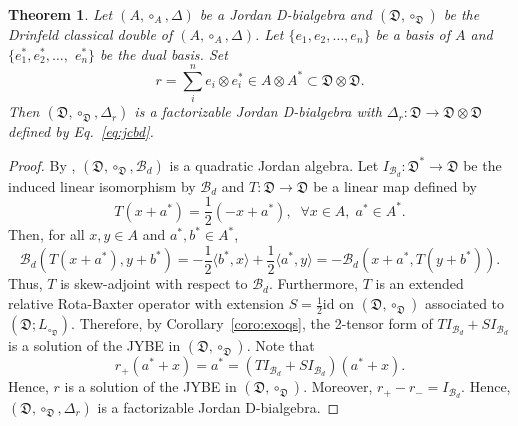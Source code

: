 \documentclass[12pt, reqno, a4paper]{amsart}
\newtheorem{theorem}{Theorem}[section]
\theoremstyle{definition}
\newcommand{\id}{\mathrm{id}}
\begin{document}
\begin{theorem}
	Let $(A, \circ_A, \Delta)$ be a Jordan D-bialgebra and $(\mathfrak{D}, \circ_{\mathfrak{D}})$ be the Drinfeld classical double of $(A, \circ_A, \Delta)$. 
	Let $\{e_{1}, e_{2}, \ldots, e_{n}\}$ be a basis of $A$ and $\{e_{1}^{*}, e_{2}^{*}, \ldots ,$ $e_{n}^{*}\}$ be the dual basis. 
	Set
	\begin{equation*}
		r=\sum_{i}^{n} e_{i} \otimes e_{i}^{*} \in A \otimes A^{*} \subset \mathfrak{D} \otimes \mathfrak{D}.
	\end{equation*}
	Then $\left(\mathfrak{D},\circ_{\mathfrak{D}},\Delta_{r} \right)$ is a factorizable Jordan D-bialgebra with $\Delta_{r}: \mathfrak{D} \to \mathfrak{D} \otimes \mathfrak{D}$ defined by Eq.~\eqref{eq:jcbd}.
\end{theorem}
\begin{proof}
	By \cite{hou2022new}, $\left(\mathfrak{D},\circ_{\mathfrak{D}}, \mathcal{B}_{d} \right)$ is a quadratic Jordan algebra.
	Let $I_{\mathcal{B}_{d}}: \mathfrak{D}^* \to \mathfrak{D}$ be the induced linear isomorphism by $\mathcal{B}_{d}$ and $T: \mathfrak{D} \to \mathfrak{D}$ be a linear map defined by
	\begin{equation*}
		T(x + a^*) = \frac{1}{2}(-x + a^*), \;\; \forall x \in A, \; a^* \in A^*.
	\end{equation*}
	Then, for all $x, y \in A$ and $a^*, b^* \in A^*$,
	\begin{equation*}
		\mathcal{B}_{d}(T(x + a^*), y + b^*) = -\frac{1}{2}\langle b^*, x\rangle + \frac{1}{2}\langle a^*, y\rangle = - \mathcal{B}_{d}(x + a^*, T(y + b^*)).
	\end{equation*}
	Thus, $T$ is skew-adjoint with respect to $\mathcal{B}_{d}$.
	Furthermore, $T$ is an extended relative Rota-Baxter operator with extension $S = \frac{1}{2}\id$ on $(\mathfrak{D}, \circ_{\mathfrak{D}})$ associated to $(\mathfrak{D}; L_{\circ_{\mathfrak{D}}})$.
	Therefore, by Corollary~\ref{coro:exoqs}, the 2-tensor form of $T I_{\mathcal{B}_d} +  SI_{\mathcal{B}_d}$  is a solution of the JYBE in $(\mathfrak{D},\circ_{\mathfrak{D}})$.
	Note that
	\begin{equation*}
		r_{+}(a^* + x) = a^* = (TI_{\mathcal{B}_d} + SI_{\mathcal{B}_d})(a^* + x).
	\end{equation*}
	Hence, $r$ is a solution of the JYBE in $(\mathfrak{D}, \circ_{\mathfrak{D}})$.
	Moreover, $r_{+} - r_{-} = I_{\mathcal{B}_d}$.
	Hence, $\left(\mathfrak{D},\circ_{\mathfrak{D}},\Delta_{r} \right)$ is a factorizable Jordan D-bialgebra.
\end{proof}
\end{document}
